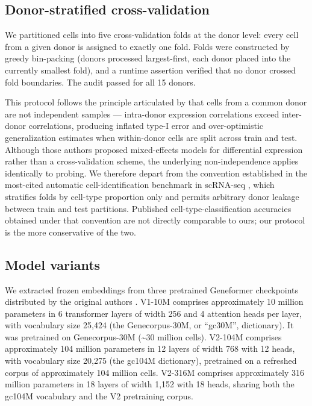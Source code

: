 \documentclass[10pt]{article}
\begin{document}
\subsection{Donor-stratified cross-validation}\label{donor-stratified-cross-validation}

We partitioned cells into five cross-validation folds at the donor
level: every cell from a given donor is assigned to exactly one fold.
Folds were constructed by greedy bin-packing (donors processed
largest-first, each donor placed into the currently smallest fold), and
a runtime assertion verified that no donor crossed fold boundaries. The
audit passed for all 15 donors.

This protocol follows the principle articulated by
\citet{zimmerman2021pseudoreplication} that cells from a common donor are not independent
samples --- intra-donor expression correlations exceed inter-donor
correlations, producing inflated type-I error and over-optimistic
generalization estimates when within-donor cells are split across train
and test. Although those authors proposed mixed-effects models for
differential expression rather than a cross-validation scheme, the
underlying non-independence applies identically to probing. We therefore
depart from the convention established in the most-cited automatic
cell-identification benchmark in scRNA-seq \citep{abdelaal2019},
which stratifies folds by cell-type proportion only and permits
arbitrary donor leakage between train and test partitions. Published
cell-type-classification accuracies obtained under that convention are
not directly comparable to ours; our protocol is the more conservative
of the two.

\subsection{Model variants}\label{model-variants}

We extracted frozen embeddings from three pretrained Geneformer
checkpoints distributed by the original authors \citep{theodoris2023}. V1-10M comprises
approximately 10 million parameters in 6 transformer layers of width 256
and 4 attention heads per layer, with vocabulary size 25,424 (the
Genecorpus-30M, or ``gc30M'', dictionary). It was pretrained on
Genecorpus-30M (\textasciitilde30 million cells). V2-104M comprises
approximately 104 million parameters in 12 layers of width 768 with 12
heads, with vocabulary size 20,275 (the gc104M dictionary), pretrained
on a refreshed corpus of approximately 104 million cells. V2-316M
comprises approximately 316 million parameters in 18 layers of width
1,152 with 18 heads, sharing both the gc104M vocabulary and the V2
pretraining corpus.
\end{document}
